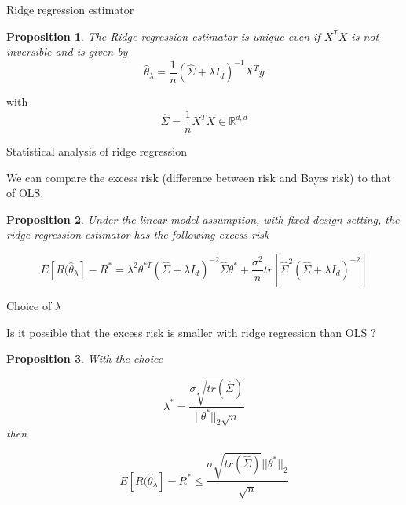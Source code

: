 \documentclass[usenames,dvipsnames]{beamer}
\newtheorem*{proposition}{Proposition}
\begin{document}
\begin{frame}{Ridge regression estimator}
\begin{proposition}


    The Ridge regression estimator is unique even if $X^TX$ is not inversible and is given by
    \begin{equation*}
	\hat{ \theta}_{\lambda} = \frac{1}{n} ( \hat{\Sigma} +\lambda I_d)^{-1}X^Ty
    \end{equation*}
\end{proposition}
with 
    \begin{equation}
	\hat{\Sigma} = \frac{1}{n} X^TX\in \mathbb{R}^{d, d}
    \end{equation}
\end{frame}

\begin{frame}{Statistical analysis of ridge regression}

    We can compare the excess risk (difference between risk and Bayes risk) to that of OLS.

\begin{proposition}
    
    Under the linear model assumption, with fixed design setting, the ridge regression estimator has the following excess risk

    \begin{equation}
	E[ R( \hat{\theta}_{\lambda}]-R^* = \lambda^2\theta^{*T} ( \hat{\Sigma}+\lambda I_d)^{-2} \hat{\Sigma} \theta^*+ \frac{\sigma^2}{n} tr[ \hat{\Sigma}^2( \hat{\Sigma}+\lambda I_d)^{-2} ]
    \end{equation}
\end{proposition}

    
\end{frame}

\begin{frame}{Choice of $\lambda$}

    Is it possible that the excess risk is smaller with ridge regression than OLS ?

\begin{proposition}
    With the choice 

    \begin{equation}
	\label{eq:lambdaopt}
	\lambda^* = \frac{\sigma \sqrt{tr( \hat{\Sigma})}}{||\theta^*||_2 \sqrt{n} } 
    \end{equation}
    then

    \begin{equation}
	\label{ref:ridgeopt}
	E[ R( \hat{\theta}_{\lambda}]-R^*\leq \frac{\sigma \sqrt{tr( \hat{\Sigma})}||\theta^*||_2 }{ \sqrt{n} } 
    \end{equation}
\end{proposition}
\end{frame}
\end{document}
